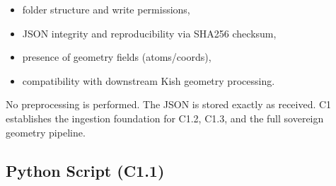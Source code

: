\documentclass[11pt, letterpaper, openany]{book}
\begin{document}
\begin{itemize}
    \item folder structure and write permissions,
    \item JSON integrity and reproducibility via SHA256 checksum,
    \item presence of geometry fields (atoms/coords),
    \item compatibility with downstream Kish geometry processing.
\end{itemize}

No preprocessing is performed. The JSON is stored exactly as received.  
C1 establishes the ingestion foundation for C1.2, C1.3, and the full sovereign
geometry pipeline.

\subsection*{Python Script (C1.1)}
\end{document}
